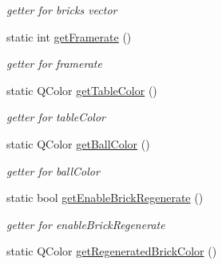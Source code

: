 \begin{DoxyCompactItemize}
\begin{DoxyCompactList}\small\item\em getter for bricks vector \end{DoxyCompactList}\item 
\hypertarget{class_config_reader_a3972a1a3e0653408fc0de365f2830aa6}{static int \hyperlink{class_config_reader_a3972a1a3e0653408fc0de365f2830aa6}{get\+Framerate} ()}\label{class_config_reader_a3972a1a3e0653408fc0de365f2830aa6}

\begin{DoxyCompactList}\small\item\em getter for framerate \end{DoxyCompactList}\item 
\hypertarget{class_config_reader_a440c4813dc49ad39265cbb21f63e836f}{static Q\+Color \hyperlink{class_config_reader_a440c4813dc49ad39265cbb21f63e836f}{get\+Table\+Color} ()}\label{class_config_reader_a440c4813dc49ad39265cbb21f63e836f}

\begin{DoxyCompactList}\small\item\em getter for table\+Color \end{DoxyCompactList}\item 
\hypertarget{class_config_reader_aa5e8b157d7e66f2c0c2f29e7bda186f5}{static Q\+Color \hyperlink{class_config_reader_aa5e8b157d7e66f2c0c2f29e7bda186f5}{get\+Ball\+Color} ()}\label{class_config_reader_aa5e8b157d7e66f2c0c2f29e7bda186f5}

\begin{DoxyCompactList}\small\item\em getter for ball\+Color \end{DoxyCompactList}\item 
\hypertarget{class_config_reader_a945a7c13adf2146105ee499543521548}{static bool \hyperlink{class_config_reader_a945a7c13adf2146105ee499543521548}{get\+Enable\+Brick\+Regenerate} ()}\label{class_config_reader_a945a7c13adf2146105ee499543521548}

\begin{DoxyCompactList}\small\item\em getter for enable\+Brick\+Regenerate \end{DoxyCompactList}\item 
\hypertarget{class_config_reader_ad5bfe9778f4efd4f3eae5531a3444922}{static Q\+Color \hyperlink{class_config_reader_ad5bfe9778f4efd4f3eae5531a3444922}{get\+Regenerated\+Brick\+Color} ()}\label{class_config_reader_ad5bfe9778f4efd4f3eae5531a3444922}


\end{DoxyCompactItemize}
